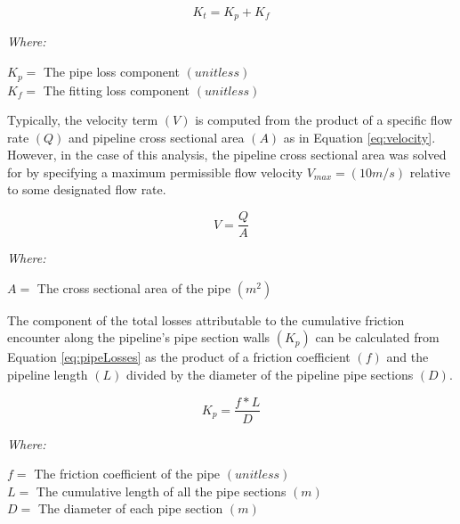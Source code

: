        \begin{equation}
           K_{t} = K_{p} + K_{f}
           \label{eq:totalLosses}
       \end{equation}
       
       \noindent \textit{Where:} \hfill
       
       \begin{center}
           $K_p = $ The pipe loss component $(unitless)$ \\
           $K_f = $ The fitting loss component $(unitless)$ \\
       \end{center}       
       
Typically, the velocity term $(V)$ is computed from the product of a specific flow rate $(Q)$ and pipeline cross sectional area $(A)$ as in Equation \ref{eq:velocity}. However, in the case of this analysis, the pipeline cross sectional area was solved for by specifying a maximum permissible flow velocity $V_{max} = (10 m/s)$ relative to some designated flow rate.
       
       \begin{equation}
           V = \frac{Q}{A}
           \label{eq:velocity}
       \end{equation}
       
       \noindent \textit{Where:} \hfill
       
       \begin{center}
           $A = $ The cross sectional area of the pipe $(m^2)$\\
       \end{center}      
       
The component of the total losses attributable to the cumulative friction encounter along the pipeline's pipe section walls $(K_p)$ can be calculated from Equation \ref{eq:pipeLosses} as the product of a friction coefficient $(f)$ and the pipeline length $(L)$ divided by the diameter of the pipeline pipe sections $(D)$.
       
       \begin{equation}
           K_{p} = \frac{f * L}{D}
           \label{eq:pipeLosses}
       \end{equation}
       
       \noindent \textit{Where:} \hfill
       
       \begin{center}
           $f = $ The friction coefficient of the pipe $(unitless)$ \\
           $L = $ The cumulative length of all the pipe sections $(m)$ \\
           $D = $ The diameter of each pipe section $(m)$ \\
       \end{center}   
       
